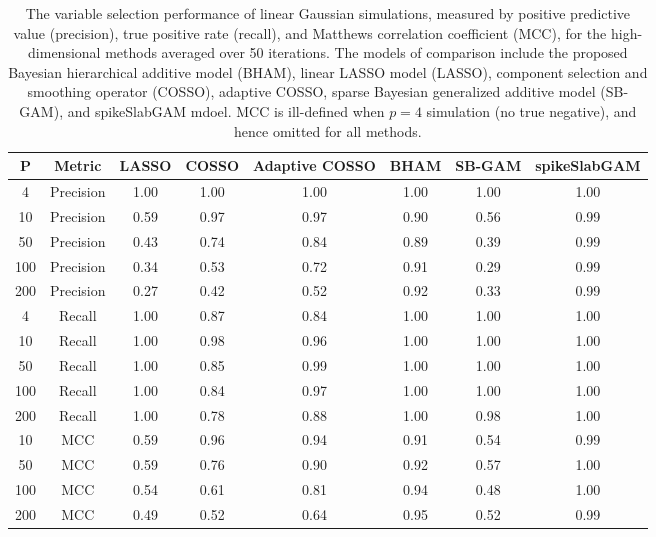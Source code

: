 \begin{table}[ht]
\centering
\begin{tabular}{cccccccc}
  \hline
P & Metric & LASSO & COSSO & Adaptive COSSO & BHAM & SB-GAM & spikeSlabGAM \\ 
  \hline
  4 & Precision & 1.00 & 1.00 & 1.00 & 1.00 & 1.00 & 1.00 \\ 
   10 & Precision & 0.59 & 0.97 & 0.97 & 0.90 & 0.56 & 0.99 \\ 
   50 & Precision & 0.43 & 0.74 & 0.84 & 0.89 & 0.39 & 0.99 \\ 
  100 & Precision & 0.34 & 0.53 & 0.72 & 0.91 & 0.29 & 0.99 \\ 
  200 & Precision & 0.27 & 0.42 & 0.52 & 0.92 & 0.33 & 0.99 \\ 
   \hline
  4 & Recall & 1.00 & 0.87 & 0.84 & 1.00 & 1.00 & 1.00 \\ 
   10 & Recall & 1.00 & 0.98 & 0.96 & 1.00 & 1.00 & 1.00 \\ 
   50 & Recall & 1.00 & 0.85 & 0.99 & 1.00 & 1.00 & 1.00 \\ 
  100 & Recall & 1.00 & 0.84 & 0.97 & 1.00 & 1.00 & 1.00 \\ 
  200 & Recall & 1.00 & 0.78 & 0.88 & 1.00 & 0.98 & 1.00 \\ 
   \hline
 10 & MCC & 0.59 & 0.96 & 0.94 & 0.91 & 0.54 & 0.99 \\ 
   50 & MCC & 0.59 & 0.76 & 0.90 & 0.92 & 0.57 & 1.00 \\ 
  100 & MCC & 0.54 & 0.61 & 0.81 & 0.94 & 0.48 & 1.00 \\ 
  200 & MCC & 0.49 & 0.52 & 0.64 & 0.95 & 0.52 & 0.99 \\ 
   \hline
\end{tabular}
\caption{The variable selection performance of linear Gaussian
                         simulations, measured by positive predictive value (precision),
                         true positive rate (recall), and Matthews correlation coefficient (MCC),
                         for the high-dimensional methods averaged over 50 iterations.
                         The models of comparison include the proposed Bayesian hierarchical additive model (BHAM),
                         linear LASSO model (LASSO), component selection and smoothing operator (COSSO),
                         adaptive COSSO, sparse Bayesian generalized additive model (SB-GAM), and spikeSlabGAM mdoel.
                         MCC is ill-defined when $p=4$ simulation (no true negative), and hence omitted for all methods.} 
\label{tab:sim_lnr_gaus_var_select}
\end{table}
